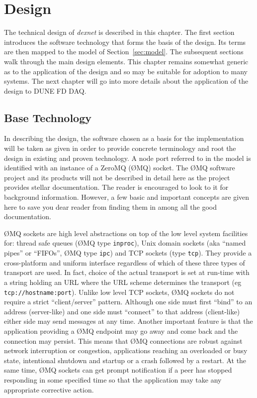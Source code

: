 \documentclass[letterpaper,oneside]{memoir}
\def\zmq{\O{}MQ\xspace}
\def\dexnet{\textit{dexnet}\xspace}
\begin{document}
\chapter{Design}

The technical design of \dexnet is described in this chapter.
The first section introduces the software technology that forms the basis of the design. 
Its terms are then mapped to the model of Section~\ref{sec:model}.
The subsequent sections walk through the main design elements.  
This chapter remains somewhat generic as to the application of the design and so may be suitable for adoption to many systems. 
The next chapter will go into more details about the application of the design to DUNE FD DAQ.

\section{Base Technology}

In describing the design, the software chosen as a basis for the implementation will be taken as given in order to provide concrete terminology and root the design in existing and proven technology. 
A node port referred to in the model is identified with an instance of a ZeroMQ (\zmq) socket. 
The \zmq software project and its products will not be described in detail here as the project provides stellar documentation. 
The reader is encouraged to look to it for background information.  
However, a few basic and important concepts are given here to save you dear reader from finding them in among all the good documentation. 

\zmq sockets are high level abstractions on top of the low level system facilities for: thread safe queues (\zmq type \texttt{inproc}), Unix domain sockets (aka ``named pipes'' or ``FIFOs'', \zmq type \texttt{ipc}) and TCP sockets (type \texttt{tcp}). 
They provide a cross-platform and uniform interface regardless of which of these three types of transport are used.
In fact, choice of the actual transport is set at run-time with a string holding an URL where the URL scheme determines the transport (eg \verb|tcp://hostname:port|). 
Unlike low level TCP sockets, \zmq sockets do not require a strict ``client/server'' pattern. 
Although one side must first ``bind'' to an address (server-like) and one side must ``connect'' to that address (client-like) either side may send messages at any time. 
Another important feature is that the application providing a \zmq endpoint may go away and come back and the connection may persist. 
This means that \zmq connections are robust against network interruption or congestion, applications reaching an overloaded or busy state, intentional shutdown and startup or a crash followed by a restart. 
At the same time, \zmq sockets can get prompt notification if a peer has stopped responding in some specified time so that the application may take any appropriate corrective action.
\end{document}
